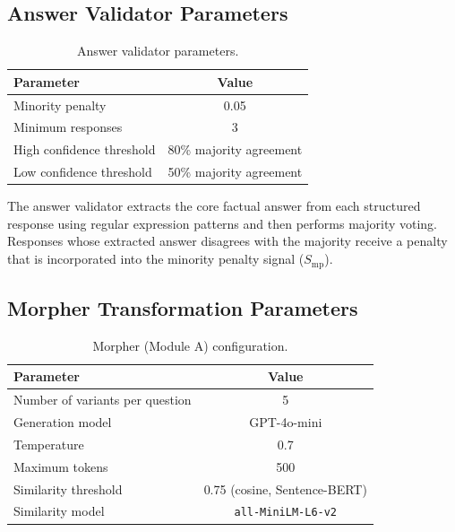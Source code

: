 \subsection{Answer Validator Parameters}

\begin{table}[!htbp]
    \centering
    \caption{Answer validator parameters.}
    \label{tab:answer-validator}
    \begin{tabular}{lc}
        \toprule
        \textbf{Parameter} & \textbf{Value} \\
        \midrule
        Minority penalty          & 0.05 \\
        Minimum responses         & 3 \\
        High confidence threshold & 80\% majority agreement \\
        Low confidence threshold  & 50\% majority agreement \\
        \bottomrule
    \end{tabular}
\end{table}

The answer validator extracts the core factual answer from each structured response using regular expression patterns and then performs majority voting. Responses whose extracted answer disagrees with the majority receive a penalty that is incorporated into the minority penalty signal ($S_{\text{mp}}$).

\subsection{Morpher Transformation Parameters}

\begin{table}[!htbp]
    \centering
    \caption{Morpher (Module A) configuration.}
    \label{tab:morpher-config}
    \begin{tabular}{lc}
        \toprule
        \textbf{Parameter} & \textbf{Value} \\
        \midrule
        Number of variants per question  & 5 \\
        Generation model                 & GPT-4o-mini \\
        Temperature                      & 0.7 \\
        Maximum tokens                   & 500 \\
        Similarity threshold             & 0.75 (cosine, Sentence-BERT) \\
        Similarity model                 & \texttt{all-MiniLM-L6-v2} \\
        \bottomrule
    \end{tabular}
\end{table}

